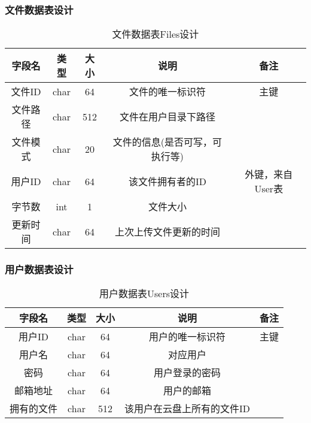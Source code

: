 \subsubsection{文件数据表设计}
\begin{table}[htbp]
\centering
\caption{文件数据表Files设计} \label{tab:file-database}
\begin{tabular}{|c|c|c|c|c|}
    \hline
    字段名 & 类型 & 大小 & 说明 & 备注 \\
    \hline
    文件ID & char & 64 & 文件的唯一标识符 & 主键\\
    \hline
    文件路径 & char & 512 & 文件在用户目录下路径 & \\
    \hline
    文件模式 & char & 20 & 文件的信息(是否可写，可执行等)& \\
    \hline
    用户ID & char & 64 & 该文件拥有者的ID & 外键，来自User表 \\
    \hline
    字节数 & int & 1 & 文件大小 & \\
    \hline
    更新时间 & char & 64 & 上次上传文件更新的时间 & \\
    \hline
\end{tabular}
\end{table}

\subsubsection{用户数据表设计}
\begin{table}[htbp]
\centering
\caption{用户数据表Users设计} \label{tab:user-database}
\begin{tabular}{|c|c|c|c|c|}
    \hline
    字段名 & 类型 & 大小 & 说明 & 备注 \\
    \hline
    用户ID & char & 64 & 用户的唯一标识符 & 主键\\
    \hline
    用户名 & char & 64 & 对应用户 & \\
    \hline
    密码 & char & 64 & 用户登录的密码 & \\
    \hline
    邮箱地址 & char & 64 & 用户的邮箱 & \\
    \hline
    拥有的文件 & char & 512 & 该用户在云盘上所有的文件ID & \\
    \hline
\end{tabular}
\end{table}

